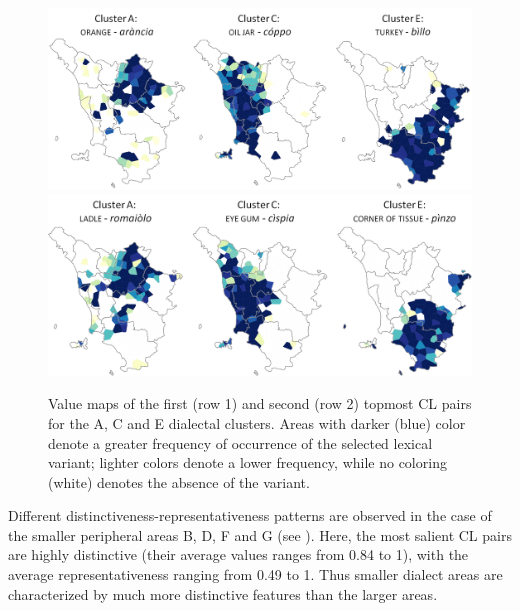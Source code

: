 \documentclass[output=paper]{LSP/langsci}
\begin{document}
\begin{figure}
\includegraphics[width=\textwidth]{illustrations/monte_wiel_fig21}\\
\includegraphics[width=\textwidth]{illustrations/monte_wiel_fig22} 
\caption{Value maps of the first (row 1) and second (row 2) topmost CL pairs for the A, C and E dialectal clusters. Areas with darker (blue) color denote a greater frequency of occurrence of the selected lexical variant; lighter colors denote a lower frequency, while no coloring (white) denotes the absence of the variant.}
\label{fig:2}
\end{figure}

Different distinctiveness-representativeness patterns are observed in the case of the smaller peripheral areas B, D, F and G (see ). Here, the most salient CL pairs are highly distinctive (their average values ranges from 0.84 to 1), with the average representativeness ranging from 0.49 to 1. Thus smaller dialect areas are characterized by much more distinctive features than the larger areas. 
\end{document}
